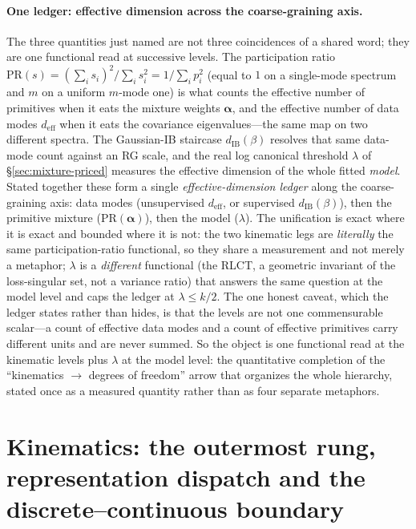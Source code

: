 \documentclass[11pt]{article}
\theoremstyle{definition}
\begin{document}
\paragraph{One ledger: effective dimension across the coarse-graining axis.} The three quantities just
named are not three coincidences of a shared word; they are one functional read at successive levels. The
participation ratio $\mathrm{PR}(s)=(\sum_i s_i)^2/\sum_i s_i^2=1/\sum_i p_i^2$ (equal to $1$ on a
single-mode spectrum and $m$ on a uniform $m$-mode one) is what counts the effective number of primitives
when it eats the mixture weights $\bm{\alpha}$, and the effective number of data modes $d_{\mathrm{eff}}$ when
it eats the covariance eigenvalues---the same map on two different spectra. The Gaussian-IB staircase
$d_{\mathrm{IB}}(\beta)$ resolves that same data-mode count against an RG scale, and the real log canonical
threshold $\lambda$ of \S\ref{sec:mixture-priced} measures the effective dimension of the whole fitted
\emph{model}. Stated together these form a single \emph{effective-dimension ledger} along the
coarse-graining axis: data modes (unsupervised $d_{\mathrm{eff}}$, or supervised $d_{\mathrm{IB}}(\beta)$),
then the primitive mixture ($\mathrm{PR}(\bm{\alpha})$), then the model ($\lambda$). The unification is exact
where it is exact and bounded where it is not: the two kinematic legs are \emph{literally} the same
participation-ratio functional, so they share a measurement and not merely a metaphor; $\lambda$ is a
\emph{different} functional (the RLCT, a geometric invariant of the loss-singular set, not a variance
ratio) that answers the same question at the model level and caps the ledger at $\lambda\le k/2$. The one
honest caveat, which the ledger states rather than hides, is that the levels are not one commensurable
scalar---a count of effective data modes and a count of effective primitives carry different units and are
never summed. So the object is one functional read at the kinematic levels plus $\lambda$ at the model
level: the quantitative completion of the ``kinematics $\to$ degrees of freedom'' arrow that organizes the
whole hierarchy, stated once as a measured quantity rather than as four separate metaphors.



\section{Kinematics: the outermost rung, representation dispatch and the discrete--continuous boundary}
\label{sec:metarouter}
\end{document}
